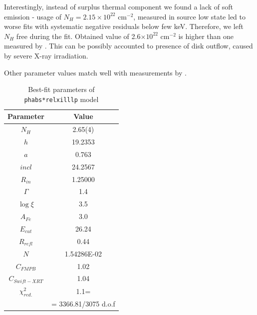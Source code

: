 \documentclass[a4paper,fleqn,usenatbib]{mnras}
\begin{document}
Interestingly, instead of surplus thermal component we found a lack of soft emission - usage of $N_{H} = 2.15\times10^{22}$ cm$^{-2}$, measured in source low state \citep{furst16} led to worse fits with systematic negative residuals below few keV. Therefore, we left $N_{H}$ free during the fit. Obtained value of 2.6$\times10^{22}$ cm$^{-2}$ is higher than one measured by \cite{furst16}. This can be possibly accounted to presence of disk outflow, caused by severe X-ray irradiation. 

Other parameter values match well with measurements by \cite{miller15_nust}. 

\begin{table}
\noindent
\centering
\caption{Best-fit parameters of \texttt{phabs*relxilllp} model}
\label{tab:fullfit}
\centering
\begin{tabular}{|c|c|}
\hline\hline
Parameter & Value \\
\hline
$N_{H}$ &   2.65(4) \\   
$h$   &  19.2353 \\
$a$    & 0.763   \\
$incl$ & 24.2567 \\
$R_{in}$  & 1.25000 \\ 
$\Gamma$& 1.4   \\
$\log{\xi}$ &  3.5 \\
$A_{Fe}$   &  3.0  \\        
$E_{cut}$    &       26.24     \\
$R_{refl}$  &         0.44    \\
$N$          &      1.54286E-02 \\
$C_{FMPB}$ & 1.02    \\
$C_{Swift-XRT}$    &   1.04\\
$\chi^{2}_{red.}$    &   1.1=\\ 
              &= 3366.81/3075 d.o.f\\

\hline
\end{tabular}
\end{table}
\end{document}
